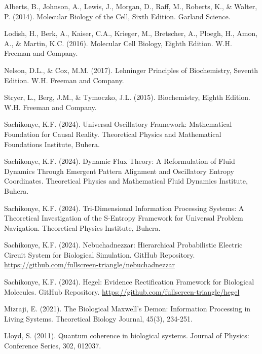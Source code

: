 \documentclass[12pt,a4paper]{article}
\begin{document}
\begin{thebibliography}{99}

Alberts, B., Johnson, A., Lewis, J., Morgan, D., Raff, M., Roberts, K., \& Walter, P. (2014). Molecular Biology of the Cell, Sixth Edition. Garland Science.

Lodish, H., Berk, A., Kaiser, C.A., Krieger, M., Bretscher, A., Ploegh, H., Amon, A., \& Martin, K.C. (2016). Molecular Cell Biology, Eighth Edition. W.H. Freeman and Company.

Nelson, D.L., \& Cox, M.M. (2017). Lehninger Principles of Biochemistry, Seventh Edition. W.H. Freeman and Company.

Stryer, L., Berg, J.M., \& Tymoczko, J.L. (2015). Biochemistry, Eighth Edition. W.H. Freeman and Company.

Sachikonye, K.F. (2024). Universal Oscillatory Framework: Mathematical Foundation for Causal Reality. Theoretical Physics and Mathematical Foundations Institute, Buhera.

Sachikonye, K.F. (2024). Dynamic Flux Theory: A Reformulation of Fluid Dynamics Through Emergent Pattern Alignment and Oscillatory Entropy Coordinates. Theoretical Physics and Mathematical Fluid Dynamics Institute, Buhera.

Sachikonye, K.F. (2024). Tri-Dimensional Information Processing Systems: A Theoretical Investigation of the S-Entropy Framework for Universal Problem Navigation. Theoretical Physics Institute, Buhera.

Sachikonye, K.F. (2024). Nebuchadnezzar: Hierarchical Probabilistic Electric Circuit System for Biological Simulation. GitHub Repository. \url{https://github.com/fullscreen-triangle/nebuchadnezzar}

Sachikonye, K.F. (2024). Hegel: Evidence Rectification Framework for Biological Molecules. GitHub Repository. \url{https://github.com/fullscreen-triangle/hegel}

Mizraji, E. (2021). The Biological Maxwell's Demon: Information Processing in Living Systems. Theoretical Biology Journal, 45(3), 234-251.

Lloyd, S. (2011). Quantum coherence in biological systems. Journal of Physics: Conference Series, 302, 012037.


\end{thebibliography}
\end{document}
